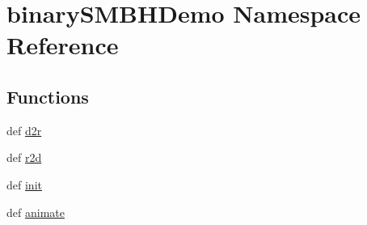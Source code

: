 \hypertarget{namespacebinary_s_m_b_h_demo}{\section{binary\-S\-M\-B\-H\-Demo Namespace Reference}
\label{namespacebinary_s_m_b_h_demo}
}
\subsection*{Functions}
\begin{DoxyCompactItemize}
\item 
def \hyperlink{namespacebinary_s_m_b_h_demo_a3c9dabd3a2711aba2cebebc9d48b7e25}{d2r}
\item 
def \hyperlink{namespacebinary_s_m_b_h_demo_af52a3980407a0804ce8abebc7d68f63f}{r2d}
\item 
def \hyperlink{namespacebinary_s_m_b_h_demo_a33ff1bc707fd0b6d5c62b03c5db2eaf0}{init}
\item 
def \hyperlink{namespacebinary_s_m_b_h_demo_aaa2c7ffa13452e185262237c6242e2cc}{animate}
\end{DoxyCompactItemize}
